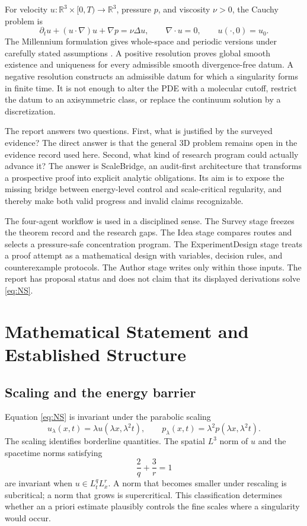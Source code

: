 \documentclass[conference]{../../../../Conference-LaTeX-template_10-17-19/IEEEtran}
\newcommand{\R}{\mathbb{R}}
\begin{document}
For velocity $u:\R^3\times[0,T)\to\R^3$, pressure $p$, and viscosity $\nu>0$, the Cauchy problem is
\begin{equation}
\partial_t u+(u\cdot\nabla)u+\nabla p=\nu\Delta u,\qquad
\nabla\cdot u=0,\qquad u(\cdot,0)=u_0.
\label{eq:NS}
\end{equation}
The Millennium formulation gives whole-space and periodic versions under carefully stated assumptions \cite{fefferman}. A positive resolution proves global smooth existence and uniqueness for every admissible smooth divergence-free datum. A negative resolution constructs an admissible datum for which a singularity forms in finite time. It is not enough to alter the PDE with a molecular cutoff, restrict the datum to an axisymmetric class, or replace the continuum solution by a discretization.

The report answers two questions. First, what is justified by the surveyed evidence? The direct answer is that the general $3$D problem remains open in the evidence record used here. Second, what kind of research program could actually advance it? The answer is ScaleBridge, an audit-first architecture that transforms a prospective proof into explicit analytic obligations. Its aim is to expose the missing bridge between energy-level control and scale-critical regularity, and thereby make both valid progress and invalid claims recognizable.

The four-agent workflow is used in a disciplined sense. The Survey stage freezes the theorem record and the research gaps. The Idea stage compares routes and selects a pressure-safe concentration program. The ExperimentDesign stage treats a proof attempt as a mathematical design with variables, decision rules, and counterexample protocols. The Author stage writes only within those inputs. The report has proposal status and does not claim that its displayed derivations solve \eqref{eq:NS}.

\section{Mathematical Statement and Established Structure}
\subsection{Scaling and the energy barrier}
Equation \eqref{eq:NS} is invariant under the parabolic scaling
\begin{equation}
u_\lambda(x,t)=\lambda u(\lambda x,\lambda^2t),\qquad
p_\lambda(x,t)=\lambda^2p(\lambda x,\lambda^2t).
\label{eq:scaling}
\end{equation}
The scaling identifies borderline quantities. The spatial $L^3$ norm of $u$ and the spacetime norms satisfying
\begin{equation}
\frac{2}{q}+\frac{3}{r}=1
\label{eq:critical}
\end{equation}
are invariant when $u\in L_t^qL_x^r$. A norm that becomes smaller under rescaling is subcritical; a norm that grows is supercritical. This classification determines whether an a priori estimate plausibly controls the fine scales where a singularity would occur.
\end{document}
